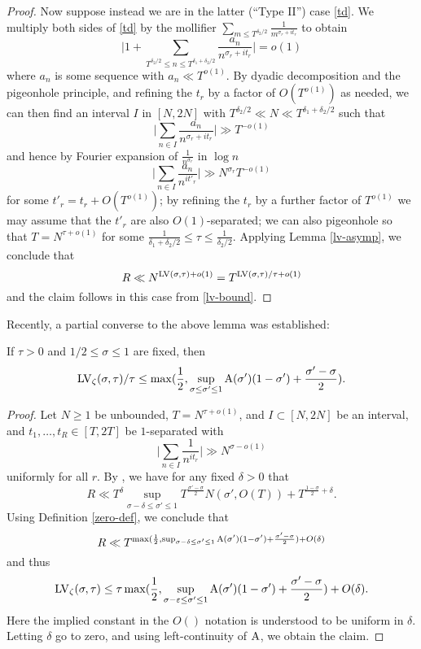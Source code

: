 \begin{proof}
Now suppose instead we are in the latter (``Type II'') case \eqref{td}.  We multiply both sides of \eqref{td} by the mollifier $\sum_{m \leq T^{\delta_2/2}} \frac{1}{m^{\sigma_r+it_r}}$ to obtain
$$ \bigg| 1 + \sum_{T^{\delta_2/2} \leq n \leq T^{\delta_1+\delta_2/2}} \frac{a_n}{n^{\sigma_r+it_r}} \bigg| = o(1)$$
where $a_n$ is some sequence with $a_n \ll T^{o(1)}$.  By dyadic decomposition and the pigeonhole principle, and refining the $t_r$ by a factor of $O(T^{o(1)})$ as needed, we can then find an interval $I$ in $[N,2N]$ with $T^{\delta_2/2} \ll N \ll T^{\delta_1+\delta_2/2}$ such that
$$ \bigg| \sum_{n \in I} \frac{a_n}{n^{\sigma_r+it_r}} \bigg| \gg T^{-o(1)}$$
and hence by Fourier expansion of $\frac{1}{n^{\sigma_r}}$ in $\log n$
$$ \bigg| \sum_{n \in I} \frac{a_n}{n^{it'_r}} \bigg| \gg N^{\sigma_r} T^{-o(1)}$$
for some $t'_r = t_r + O(T^{o(1)})$; by refining the $t_r$ by a further factor of $T^{o(1)}$ we may assume that the $t'_r$ are also $O(1)$-separated; we can also pigeonhole so that $T = N^{\tau+o(1)}$ for some $\frac{1}{\delta_1+\delta_2/2} \leq \tau \leq \frac{1}{\delta_2/2}$.  Applying Lemma \ref{lv-asymp}, we conclude that
$$ R \ll N^{\mathrm{LV}(\sigma,\tau)+o(1)} = T^{\mathrm{LV}(\sigma,\tau)/\tau+o(1)}$$
and the claim follows in this case from \eqref{lv-bound}.
\end{proof}

Recently, a partial converse to the above lemma was established:

\begin{lemma}\cite[Theorem 1.2]{matomaki_teravainen_2024} If $\tau > 0$ and $1/2 \leq \sigma \leq 1$ are fixed, then
    $$ \mathrm{LV}_\zeta(\sigma,\tau)/\tau \leq \max( \frac{1}{2}, \sup_{\sigma \leq \sigma' \leq 1} \mathrm{A}(\sigma')(1-\sigma') + \frac{\sigma'-\sigma}{2} ).$$
\end{lemma}

\begin{proof}  Let $N \geq 1$ be unbounded, $T = N^{\tau+o(1)}$, and $I \subset [N,2N]$ be an interval, and $t_1,\dots,t_R \in [T,2T]$ be $1$-separated with
$$ \bigg| \sum_{n \in I} \frac{1}{n^{it_r}} \bigg| \gg N^{\sigma-o(1)}$$
uniformly for all $r$.  By \cite[Theorem 1.2]{matomaki_teravainen_2024}, we have for any fixed $\delta>0$ that
$$ R \ll T^\delta \sup_{\sigma-\delta \leq \sigma' \leq 1} T^{\frac{\sigma' - \sigma}{2}} N(\sigma', O(T)) + T^{\frac{1-\sigma}{2}+\delta}.$$
Using Definition \ref{zero-def}, we conclude that
$$ R \ll T^{\max( \frac{1}{2}, \sup_{\sigma-\delta \leq \sigma' \leq 1} \mathrm{A}(\sigma')(1-\sigma') + \frac{\sigma'-\sigma}{2} ) + O(\delta)}$$
and thus
$$ \mathrm{LV}_\zeta(\sigma,\tau) \leq \tau \max( \frac{1}{2}, \sup_{\sigma-\varepsilon \leq \sigma' \leq 1} \mathrm{A}(\sigma')(1-\sigma') + \frac{\sigma'-\sigma}{2} ) + O(\delta).$$
Here the implied constant in the $O()$ notation is understood to be uniform in $\delta$.
Letting $\delta$ go to zero, and using left-continuity of $\mathrm{A}$, we obtain the claim.
\end{proof}

